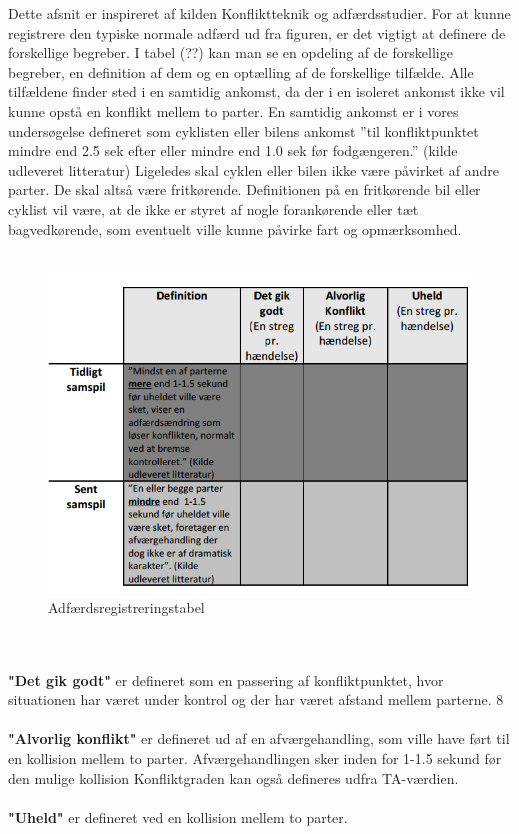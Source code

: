 Dette	afsnit	er	inspireret	af	kilden	Konfliktteknik	og	adfærdsstudier.
For	at	kunne	registrere	den	typiske	normale	adfærd	ud	fra	figuren,	er	det	vigtigt	at
definere	de	forskellige	begreber.
I	tabel	(??)	kan	man	se	en	opdeling	af	de	forskellige	begreber,	en	definition	af	dem
og	en	optælling	af	de	forskellige	tilfælde.	Alle	tilfældene	finder	sted	i	en	samtidig
ankomst,	da	der	i	en	isoleret	ankomst	ikke	vil	kunne	opstå	en	konflikt	mellem	to
parter.	En	samtidig	ankomst	er	i	vores	undersøgelse	defineret	som	cyklisten	eller
bilens	ankomst	”til	konfliktpunktet	mindre	end	2.5	sek	efter	eller	mindre	end		1.0	sek	før	fodgængeren.” (kilde	udleveret	litteratur)	Ligeledes	skal	cyklen	eller	bilen
ikke	være	påvirket	af	andre	parter.	De	skal	altså	være	fritkørende.	Definitionen	på
en	fritkørende	bil	eller	cyklist	vil	være,	at	de	ikke	er	styret	af	nogle	forankørende
eller	tæt	bagvedkørende,	som	eventuelt	ville	kunne	påvirke fart	og	opmærksomhed.
\\\\
\begin{figure}[htbp]
  \label{fig:adfregtabel}
  \centering
  \begin{adjustbox}{max width=\textwidth}
    \includegraphics{billederogfigur/obstabel.png} %
 \end{adjustbox}
  \caption{Adfærdsregistreringstabel}
\end{figure}
\\\\
\textbf{"Det	gik	godt"} er	defineret	som	en	passering	af	konfliktpunktet,	hvor	situationen
har	været	under	kontrol	og	der	har	været	afstand	mellem	parterne.
8
\\\\
\textbf{"Alvorlig konflikt"}	er	defineret	ud	af	en	afværgehandling,	som	ville	have	ført	til	en
kollision	mellem	to	parter. Afværgehandlingen	sker	inden	for	1-1.5	sekund	før	den
mulige	kollision%
Konfliktgraden kan også defineres udfra TA-værdien.
\\\\
\textbf{"Uheld"} er	defineret	ved	en	kollision	mellem	to	parter.



